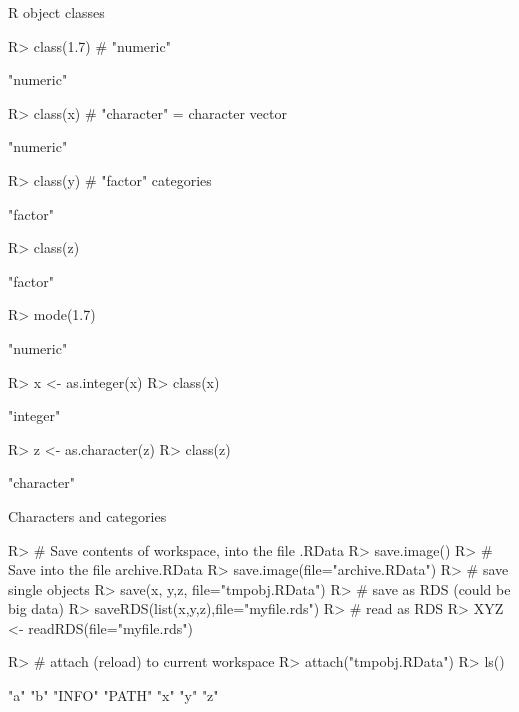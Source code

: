 \documentclass[10pt]{beamer}
\let\proglang=\textsf
\begin{document}
\begin{frame}[fragile]{\proglang{R} object classes}
\begin{Schunk}
\begin{Sinput}
R> class(1.7) # "numeric"
\end{Sinput}
\begin{Soutput}
[1] "numeric"
\end{Soutput}
\begin{Sinput}
R> class(x)   # "character" = character vector
\end{Sinput}
\begin{Soutput}
[1] "numeric"
\end{Soutput}
\begin{Sinput}
R> class(y)   # "factor" categories
\end{Sinput}
\begin{Soutput}
[1] "factor"
\end{Soutput}
\begin{Sinput}
R> class(z)
\end{Sinput}
\begin{Soutput}
[1] "factor"
\end{Soutput}
\begin{Sinput}
R> mode(1.7)
\end{Sinput}
\begin{Soutput}
[1] "numeric"
\end{Soutput}
\begin{Sinput}
R> x <- as.integer(x)
R> class(x)
\end{Sinput}
\begin{Soutput}
[1] "integer"
\end{Soutput}
\begin{Sinput}
R> z <- as.character(z)
R> class(z)
\end{Sinput}
\begin{Soutput}
[1] "character"
\end{Soutput}
\end{Schunk}
\end{frame}
%
\begin{frame}[fragile]{Characters and categories}
\begin{Schunk}
\begin{Sinput}
R> # Save contents of workspace, into the file .RData
R> save.image()
R> # Save into the file archive.RData
R> save.image(file="archive.RData")
R> # save single objects
R> save(x, y,z, file="tmpobj.RData")
R> # save as RDS (could be big data)
R> saveRDS(list(x,y,z),file="myfile.rds")
R> # read as RDS
R> XYZ <- readRDS(file="myfile.rds")
\end{Sinput}
\end{Schunk}
\begin{Schunk}
\begin{Sinput}
R> # attach (reload) to current workspace
R> attach("tmpobj.RData")
R> ls()
\end{Sinput}
\begin{Soutput}
[1] "a"    "b"    "INFO" "PATH" "x"    "y"    "z"   
\end{Soutput}
\end{Schunk}
\end{frame}
\end{document}
